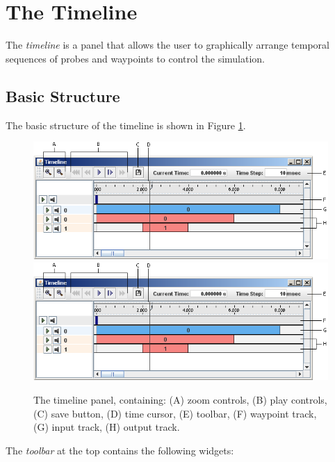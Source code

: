 \documentclass{article}
\begin{document}
\section{The Timeline}
\label{TimelineSec}

The {\it timeline} is a panel that allows the user to graphically
arrange temporal sequences of probes and waypoints to control the
simulation.

\subsection{Basic Structure}

The basic structure of the timeline is shown in 
Figure \ref{timelineFig}.

\begin{figure}
\begin{center}
\iflatexml
\includegraphics[]{images/timeline}
\else
\includegraphics[width=.75\textwidth]{images/timeline}
\fi
\end{center}
\caption{The timeline panel, containing: (A) zoom controls, (B) play
controls, (C) save button, (D) time cursor, (E) toolbar, (F) waypoint
track, (G) input track, (H) output track.}%
\label{timelineFig}
\end{figure}

The {\it toolbar} at the top contains the following widgets:
\end{document}
